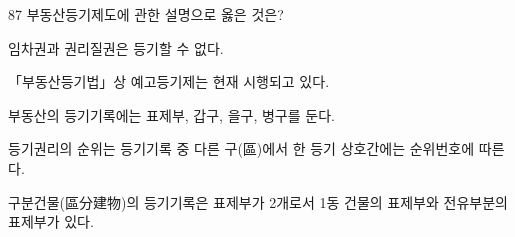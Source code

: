 \begin{question}{87}
부동산등기제도에 관한 설명으로 옳은 것은?
\begin{choices}
  \item 임차권과 권리질권은 등기할 수 없다.
  \item 「부동산등기법」상 예고등기제는 현재 시행되고 있다.
  \item 부동산의 등기기록에는 표제부, 갑구, 을구, 병구를 둔다.
  \item 등기권리의 순위는 등기기록 중 다른 구(區)에서 한 등기 상호간에는 순위번호에 따른다.
  \item 구분건물(區分建物)의 등기기록은 표제부가 2개로서 1동 건물의 표제부와 전유부분의 표제부가 있다.
\end{choices}
\end{question}
